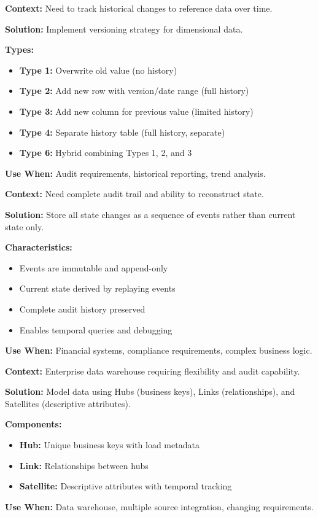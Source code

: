 \documentclass[11pt,letterpaper]{article}
\begin{document}
\begin{patternbox}
\textbf{Context:} Need to track historical changes to reference data over time.

\textbf{Solution:} Implement versioning strategy for dimensional data.

\textbf{Types:}
\begin{itemize}[nosep]
    \item \textbf{Type 1:} Overwrite old value (no history)
    \item \textbf{Type 2:} Add new row with version/date range (full history)
    \item \textbf{Type 3:} Add new column for previous value (limited history)
    \item \textbf{Type 4:} Separate history table (full history, separate)
    \item \textbf{Type 6:} Hybrid combining Types 1, 2, and 3
\end{itemize}

\textbf{Use When:} Audit requirements, historical reporting, trend analysis.
\end{patternbox}

\begin{patternbox}
\textbf{Context:} Need complete audit trail and ability to reconstruct state.

\textbf{Solution:} Store all state changes as a sequence of events rather than current state only.

\textbf{Characteristics:}
\begin{itemize}[nosep]
    \item Events are immutable and append-only
    \item Current state derived by replaying events
    \item Complete audit history preserved
    \item Enables temporal queries and debugging
\end{itemize}

\textbf{Use When:} Financial systems, compliance requirements, complex business logic.
\end{patternbox}

\begin{patternbox}
\textbf{Context:} Enterprise data warehouse requiring flexibility and audit capability.

\textbf{Solution:} Model data using Hubs (business keys), Links (relationships), and Satellites (descriptive attributes).

\textbf{Components:}
\begin{itemize}[nosep]
    \item \textbf{Hub:} Unique business keys with load metadata
    \item \textbf{Link:} Relationships between hubs
    \item \textbf{Satellite:} Descriptive attributes with temporal tracking
\end{itemize}

\textbf{Use When:} Data warehouse, multiple source integration, changing requirements.
\end{patternbox}
\end{document}
